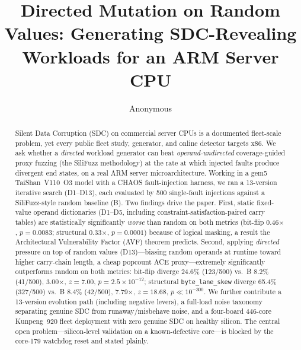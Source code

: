 \documentclass[sigplan,review,anonymous]{acmart}
\begin{document}
\title{Directed Mutation on Random Values: Generating SDC-Revealing Workloads for an ARM Server CPU}

\author{Anonymous}

\begin{abstract}
Silent Data Corruption (SDC) on commercial server CPUs is a documented fleet-scale problem, yet every public fleet study, generator, and online detector targets x86. We ask whether a \emph{directed} workload generator can beat \emph{operand-undirected} coverage-guided proxy fuzzing (the SiliFuzz methodology) at the rate at which injected faults produce divergent end states, on a real ARM server microarchitecture. Working in a gem5 TaiShan~V110~O3 model with a CHAOS fault-injection harness, we ran a 13-version iterative search (D1--D13), each evaluated by 500 single-fault injections against a SiliFuzz-style random baseline (B). Two findings drive the paper. First, static fixed-value operand dictionaries (D1--D5, including constraint-satisfaction-paired carry tables) are statistically significantly \emph{worse} than random on both metrics (bit-flip 0.46$\times$, $p{=}0.0083$; structural 0.33$\times$, $p{=}0.0001$) because of logical masking, a result the Architectural Vulnerability Factor (AVF) theorem predicts. Second, applying \emph{directed} pressure on top of random values (D13)---biasing random operands at runtime toward higher carry-chain length, a cheap popcount ACE proxy---extremely significantly outperforms random on both metrics: bit-flip diverge 24.6\% (123/500) vs.\ B 8.2\% (41/500), 3.00$\times$, $z{=}7.00$, $p{=}2.5\times10^{-12}$; structural \texttt{byte\_lane\_skew} diverge 65.4\% (327/500) vs.\ B 8.4\% (42/500), 7.79$\times$, $z{=}18.68$, $p{\ll}10^{-300}$. We further contribute a 13-version evolution path (including negative levers), a full-load noise taxonomy separating genuine SDC from runaway/misbehave noise, and a four-board 446-core Kunpeng~920 fleet deployment with zero genuine SDC on healthy silicon. The central open problem---silicon-level validation on a known-defective core---is blocked by the core-179 watchdog reset and stated plainly.
\end{abstract}

\begin{CCSXML}
\end{CCSXML}

\end{document}
